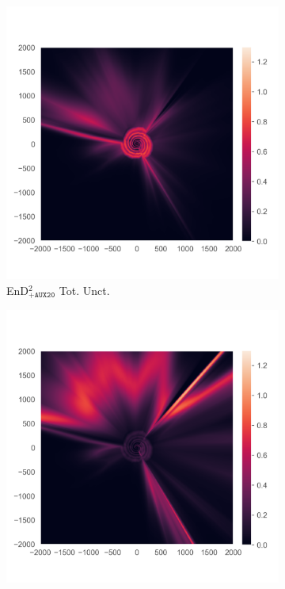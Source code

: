 \begin{figure}
\begin{subfigure}{0.22\textwidth}
  \centering
  \includegraphics[trim=42 45 15 55, clip, width=\linewidth]{../openreview/plots/3q.png}
  \caption{EnD$^2_{\texttt{+AUX20}}$ Tot. Unct.}
  \label{fig:3p}
\end{subfigure}%
\begin{subfigure}{0.22\textwidth}
  \centering
  \includegraphics[trim=42 45 15 55, clip, width=\linewidth]{../openreview/plots/3r.png}

\end{subfigure}
\end{figure}
